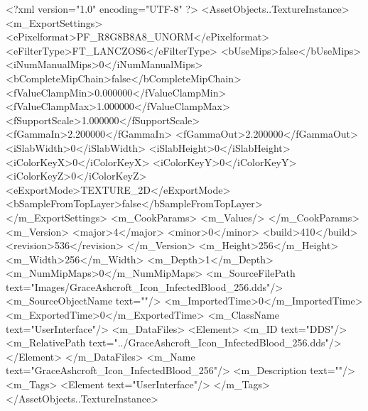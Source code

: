 <?xml version="1.0" encoding="UTF-8" ?>
<AssetObjects..TextureInstance>
	<m_ExportSettings>
		<ePixelformat>PF_R8G8B8A8_UNORM</ePixelformat>
		<eFilterType>FT_LANCZOS6</eFilterType>
		<bUseMips>false</bUseMips>
		<iNumManualMips>0</iNumManualMips>
		<bCompleteMipChain>false</bCompleteMipChain>
		<fValueClampMin>0.000000</fValueClampMin>
		<fValueClampMax>1.000000</fValueClampMax>
		<fSupportScale>1.000000</fSupportScale>
		<fGammaIn>2.200000</fGammaIn>
		<fGammaOut>2.200000</fGammaOut>
		<iSlabWidth>0</iSlabWidth>
		<iSlabHeight>0</iSlabHeight>
		<iColorKeyX>0</iColorKeyX>
		<iColorKeyY>0</iColorKeyY>
		<iColorKeyZ>0</iColorKeyZ>
		<eExportMode>TEXTURE_2D</eExportMode>
		<bSampleFromTopLayer>false</bSampleFromTopLayer>
	</m_ExportSettings>
	<m_CookParams>
		<m_Values/>
	</m_CookParams>
	<m_Version>
		<major>4</major>
		<minor>0</minor>
		<build>410</build>
		<revision>536</revision>
	</m_Version>
	<m_Height>256</m_Height>
	<m_Width>256</m_Width>
	<m_Depth>1</m_Depth>
	<m_NumMipMaps>0</m_NumMipMaps>
	<m_SourceFilePath text="Images/GraceAshcroft_Icon_InfectedBlood_256.dds"/>
	<m_SourceObjectName text=""/>
	<m_ImportedTime>0</m_ImportedTime>
	<m_ExportedTime>0</m_ExportedTime>
	<m_ClassName text="UserInterface"/>
	<m_DataFiles>
		<Element>
			<m_ID text="DDS"/>
			<m_RelativePath text="../GraceAshcroft_Icon_InfectedBlood_256.dds"/>
		</Element>
	</m_DataFiles>
	<m_Name text="GraceAshcroft_Icon_InfectedBlood_256"/>
	<m_Description text=""/>
	<m_Tags>
		<Element text="UserInterface"/>
	</m_Tags>
</AssetObjects..TextureInstance>
